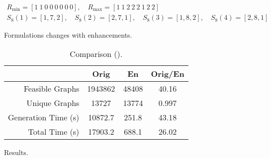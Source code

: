 \begin{table}[ht]
    \centering

    \begin{subfigure}[b]{\textwidth}
        \centering
        \caption{Formulations changes with enhancements.}
        \vspace*{-3ex}
        \begin{gather*}
        R_{\min} = [1\ 1\ 0\ 0\ 0\ 0\ 0\ 0], \quad R_{\max} = [1\ 1\ 2\ 2\ 2\ 1\ 2\ 2] \\
        S_8(1) = [1,7,2], \quad S_8(2) = [2,7,1], \quad S_8(3) = [1,8,2], \quad S_8(4) = [2,8,1]
        \end{gather*}
    \end{subfigure}%
    \vspace*{1ex}
    \begin{subfigure}[b]{\textwidth}
        \centering
        \caption{Results.}
		\begin{tabular}{r | c | c | c}
		\hline \hline
		& Orig & En & Orig/En \\
		\hline
		Feasible Graphs & 1943862 & 48408 & 40.16 \\ 
		Unique Graphs & 13727 & 13774 & 0.997 \\
		Generation Time (s) & 10872.7 & 251.8 & 43.18 \\
		Total Time (s) & 17903.2 & 688.1 & 26.02 \\
		\hline \hline
		\end{tabular}
    \end{subfigure}

    \caption{Comparison ().\label{fig:app1:case-study-3}}

\end{table}